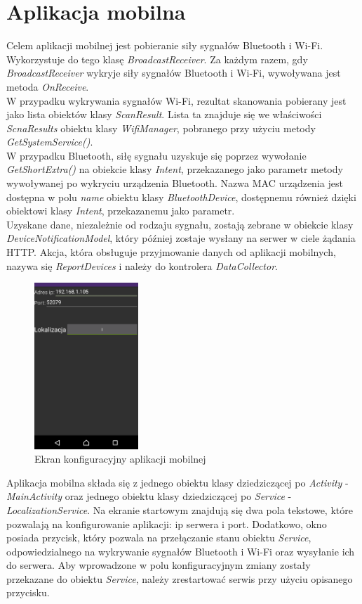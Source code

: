 \section{Aplikacja mobilna}
Celem aplikacji mobilnej jest pobieranie siły sygnałów Bluetooth i Wi-Fi. Wykorzystuje do tego klasę \textit{BroadcastReceiver}. Za każdym razem, gdy \textit{BroadcastReceiver} wykryje siły sygnałów Bluetooth i Wi-Fi, wywoływana jest metoda \textit{OnReceive}.\\
W przypadku wykrywania sygnałów Wi-Fi, rezultat skanowania pobierany jest jako lista obiektów klasy \textit{ScanResult}. Lista ta znajduje się we właściwości \textit{ScnaResults} obiektu klasy \textit{WifiManager}, pobranego przy użyciu metody \textit{GetSystemService()}.\\
W przypadku Bluetooth, siłę sygnału uzyskuje się poprzez wywołanie \textit{GetShortExtra()} na obiekcie klasy \textit{Intent}, przekazanego jako parametr metody wywoływanej po wykryciu urządzenia Bluetooth. Nazwa MAC urządzenia jest dostępna w polu \textit{name} obiektu klasy \textit{BluetoothDevice}, dostępnemu również dzięki obiektowi klasy \textit{Intent}, przekazanemu jako parametr.\\
Uzyskane dane, niezależnie od rodzaju sygnału, zostają zebrane w obiekcie klasy \textit{DeviceNotificationModel}, który później zostaje wysłany na serwer w ciele żądania HTTP. Akcja, która obsługuje przyjmowanie danych od aplikacji mobilnych, nazywa się \textit{ReportDevices} i należy do kontrolera \textit{DataCollector}.\\
\begin{figure}[H]			
	\centering
	\caption{Ekran konfiguracyjny aplikacji mobilnej}
	\includegraphics[width=0.35\textwidth]{apk_mobilna}
\end{figure}
Aplikacja mobilna składa się z jednego obiektu klasy dziedziczącej po \textit{Activity} - \textit{MainActivity} oraz jednego obiektu klasy dziedziczącej po \textit{Service} - \textit{LocalizationService}. Na ekranie startowym znajdują się dwa pola tekstowe, które pozwalają na konfigurowanie aplikacji: ip serwera i port. Dodatkowo, okno posiada przycisk, który pozwala na przełączanie stanu obiektu \textit{Service}, odpowiedzialnego na wykrywanie sygnałów Bluetooth i Wi-Fi oraz wysyłanie ich do serwera. Aby wprowadzone w polu konfiguracyjnym zmiany zostały przekazane do obiektu \textit{Service}, należy zrestartować serwis przy użyciu opisanego przycisku.\\
